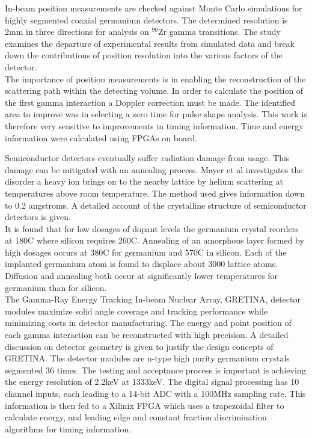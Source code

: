 \documentclass[12pt]{article}
\begin{document}
\begin{doublespacing}
In-beam position measurements are checked against Monte Carlo simulations for highly segmented coaxial germanium detectors. The determined resolution is 2mm in three directions for analysis on $^{90}\mbox{Zr}$ gamma transitions. The study examines the departure of experimental results from simulated data and break down the contributions of position resolution into the various factors of the detector.
\\
The importance of position measurements is in enabling the reconstruction of the scattering path within the detecting volume. In order to calculate the position of the first gamma interaction a Doppler correction must be made. The identified area to improve was in selecting a zero time for pulse shape analysis. This work is therefore very sensitive to improvements in timing information. Time and energy information were calculated using FPGAs on board.
\\[20pt]


{\large\textbf{\cite{Mayer}}}

Semiconductor detectors eventually suffer radiation damage from usage. This damage can be mitigated with an annealing process. Mayer et al investigates the disorder a heavy ion brings on to the nearby lattice by helium scattering at temperatures above room temperature. The method used gives information down to 0.2 angstroms. A detailed account of the crystalline structure of semiconductor detectors is given.
\\
It is found that for low dosages of dopant levels the germanium crystal reorders at 180C where silicon requires 260C. Annealing of an amorphous layer formed by high dosages occurs at 380C for germanium and 570C in silicon. Each of the implanted germanium atom is found to displace about 3000 lattice atoms. Diffusion and annealing both occur at significantly lower temperatures for germanium than for silicon.
\\[20pt]


{\large\textbf{\cite{Paschalis201344}}}
The Gamma-Ray Energy Tracking In-beam Nuclear Array, GRETINA, detector modules maximize solid angle coverage and tracking performance while minimizing costs in detector manufacturing. The energy and point position of each gamma interaction can be reconstructed with high precision. A detailed discussion on detector geometry is given to justify the design concepts of GRETINA. The detector modules are n-type high purity germanium crystals segmented 36 times. The testing and acceptance process is important is achieving the energy resolution of 2.2keV at 1333keV. The digital signal processing has 10 channel inputs, each leading to a 14-bit ADC with a 100MHz sampling rate. This information is then fed to a Xilinix FPGA which uses a trapezoidal filter to calculate energy, and leading edge and constant fraction discrimination algorithms for timing information.
\\[20pt]



\end{doublespacing}
\end{document}
